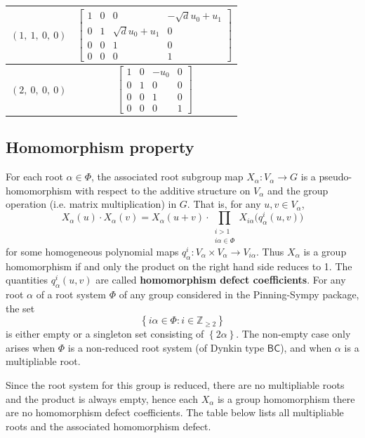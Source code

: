 \documentclass[11pt]{article}
\newcommand{\noi}{\noindent}
\newcommand{\tbf}{\textbf}
\newcommand{\lb}{\left\{}
\newcommand{\rb}{\right\}}
\newcommand{\Z}{\mathbb{Z}}
\theoremstyle{definition}
\newif\ifrootsystemreduced
\begin{document}
\begin{longtable}{|l|c|}
    \hline
    $\left( 1, \  1, \  0, \  0\right)$ & ${\left[\begin{matrix}1 & 0 & 0 & - \sqrt{d} u_{0} + u_{1}\\0 & 1 & \sqrt{d} u_{0} + u_{1} & 0\\0 & 0 & 1 & 0\\0 & 0 & 0 & 1\end{matrix}\right]}$ \\
    \hline
    $\left( 2, \  0, \  0, \  0\right)$ & ${\left[\begin{matrix}1 & 0 & - u_{0} & 0\\0 & 1 & 0 & 0\\0 & 0 & 1 & 0\\0 & 0 & 0 & 1\end{matrix}\right]}$ \\
    \hline
\end{longtable}


\subsection{Homomorphism property}

\noi For each root $\alpha \in \Phi$, the associated root subgroup map $X_\alpha:V_\alpha \to G$ is a pseudo-homomorphism with respect to the additive structure on $V_\alpha$ and the group operation (i.e. matrix multiplication) in $G$. That is, for any $u,v \in V_\alpha$,
\begin{equation}
\label{pseudo homomorphism}
	X_\alpha(u) \cdot X_\alpha(v) = X_\alpha(u+v) \cdot \prod_{\substack{i > 1 \\ i \alpha \in \Phi}} X_{i \alpha} \Big( q^i_\alpha(u,v) \Big)
\end{equation}
for some homogeneous polynomial maps $q^i_\alpha:V_\alpha \times V_\alpha \to V_{i \alpha}$. Thus $X_\alpha$ is a group homomorphism if and only the product on the right hand side reduces to 1. The quantities $q^i_\alpha(u,v)$ are called \tbf{homomorphism defect coefficients}. For any root $\alpha$ of a root system $\Phi$ of any group considered in the Pinning-Sympy package, the set
\[
	\lb i \alpha \in \Phi : i \in \Z_{\ge 2} \rb
\]
is either empty or a singleton set consisting of $\lb 2 \alpha \rb$. The non-empty case only arises when $\Phi$ is a non-reduced root system (of Dynkin type $\mathsf{BC}$), and when $\alpha$ is a multipliable root. 

\ifrootsystemreduced
Since the root system for this group is reduced, there are no multipliable roots and the product is always empty, hence each $X_\alpha$ is a group homomorphism there are no homomorphism defect coefficients.
\else
The table below lists all multipliable roots and the associated homomorphism defect.
\end{document}
